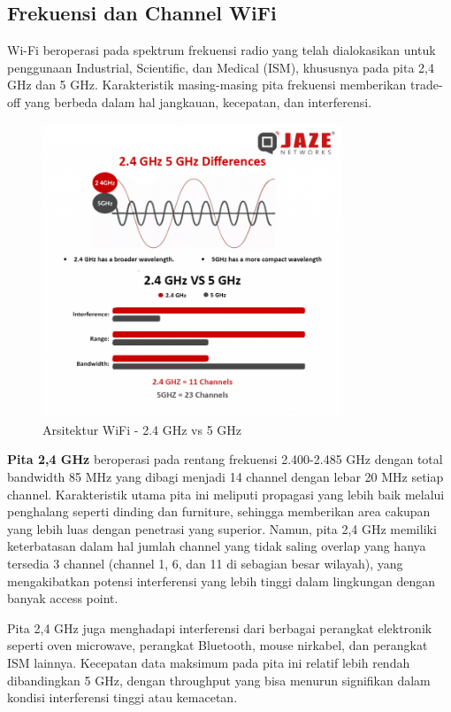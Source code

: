 \subsection{Frekuensi dan Channel WiFi}

Wi-Fi beroperasi pada spektrum frekuensi radio yang telah dialokasikan untuk penggunaan Industrial, Scientific, dan Medical (ISM), khususnya pada pita 2,4 GHz dan 5 GHz. Karakteristik masing-masing pita frekuensi memberikan trade-off yang berbeda dalam hal jangkauan, kecepatan, dan interferensi.

\begin{figure}[htbp]
    \centering
    \includegraphics[width=0.8\textwidth]{assets/pics/bab3_4.png}
    \caption{Arsitektur WiFi - 2.4 GHz vs 5 GHz}
    \label{fig:digital_twin_concept}
\end{figure}

\textbf{Pita 2,4 GHz} beroperasi pada rentang frekuensi 2.400-2.485 GHz dengan total bandwidth 85 MHz yang dibagi menjadi 14 channel dengan lebar 20 MHz setiap channel. Karakteristik utama pita ini meliputi propagasi yang lebih baik melalui penghalang seperti dinding dan furniture, sehingga memberikan area cakupan yang lebih luas dengan penetrasi yang superior. Namun, pita 2,4 GHz memiliki keterbatasan dalam hal jumlah channel yang tidak saling overlap yang hanya tersedia 3 channel (channel 1, 6, dan 11 di sebagian besar wilayah), yang mengakibatkan potensi interferensi yang lebih tinggi dalam lingkungan dengan banyak access point.

Pita 2,4 GHz juga menghadapi interferensi dari berbagai perangkat elektronik seperti oven microwave, perangkat Bluetooth, mouse nirkabel, dan perangkat ISM lainnya. Kecepatan data maksimum pada pita ini relatif lebih rendah dibandingkan 5 GHz, dengan throughput yang bisa menurun signifikan dalam kondisi interferensi tinggi atau kemacetan.

